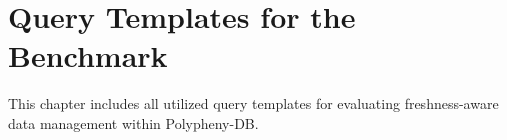 \chapter{Query Templates for the Benchmark}
This chapter includes all utilized query templates for evaluating freshness-aware data management within Polypheny-DB.